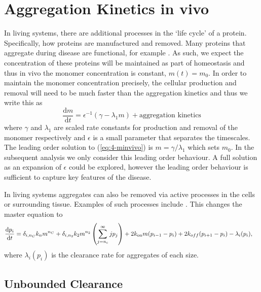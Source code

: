 \section{Aggregation Kinetics in vivo}

In living systems, there are additional processes in the `life cycle' of a protein. Specifically, how proteins are manufactured and removed. Many proteins that aggregate during disease are functional, for example . As such, we expect the concentration of these proteins will be maintained as part of homeostasis and thus in vivo the monomer concentration is constant, $m(t)=m_0$. In order to maintain the monomer concentration precisely, the cellular production and removal will need to be much faster than the aggregation kinetics and thus we write this as
\begin{equation}
    \frac{\text{d}m}{\text{d}t} = \epsilon^{-1}\left( \gamma - \lambda_1 m \right) + \text{aggregation kinetics}
    \label{eq:4-minvivo}
\end{equation}
where $\gamma$ and $\lambda_1$ are scaled rate constants for production and removal of the monomer respectively and $\epsilon$ is a small parameter that separates the timescales. The leading order solution to (\ref{eq:4-minvivo}) is $m=\gamma/\lambda_1$ which sets $m_0$. In the subsequent analysis we only consider this leading order behaviour. A full solution as an expansion of $\epsilon$ could be explored, however the leading order behaviour is sufficient to capture key features of the disease.

In living systems aggregates can also be removed via active processes in the cells or surrounding tissue. Examples of such processes include . This changes the master equation to
\begin{equation}
\begin{split}
    \frac{\text{d}p_i}{\text{d}t} &= \delta_{i, n_C}k_n m^{n_C} + \delta_{i, n_2} k_2 m^{n_2} \left(\sum_{j=n_{\mathrm{c}}}^{\infty} j p_j\right) + 2k_\text{on} m (p_{i-1}-p_i) + 2k_{off} (p_{i+1}-p_i) - \lambda_i(p_i),
    \end{split}
    \label{eq:4-pi_cleared}
\end{equation}
where $\lambda_i(p_i)$ is the clearance rate for aggregates of each size.

\subsection{Unbounded Clearance}

